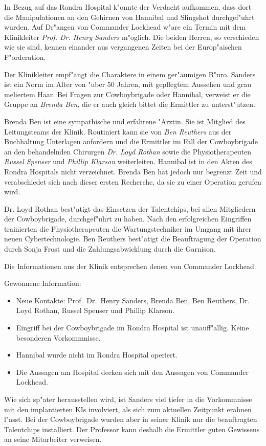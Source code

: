 
In Bezug auf das Rondra Hospital k"onnte der Verdacht aufkommen, dass dort die Manipulationen an den Gehirnen von Hannibal und Slingshot durchgef"uhrt wurden. Auf Dr"angen von Commander Lockhead w"are ein Termin mit dem Klinikleiter \emph{Prof. Dr. Henry Sanders} m"oglich. Die beiden Herren, so verschieden wie sie sind, kennen einander aus vergangenen Zeiten bei der Europ"aischen F"orderation.

Der Klinikleiter empf"angt die Charaktere in einem ger"aumigen B"uro. Sanders ist ein Norm im Alter von "uber 50 Jahren, mit gepflegtem Aussehen und grau meliertem Haar. Bei Fragen zur Cowboybrigade oder Hannibal, verweist er die Gruppe an \emph{Brenda Ben}, die er auch gleich bittet die Ermittler zu unterst"utzen. 

Brenda Ben ist eine sympathische und erfahrene "Arztin. Sie ist Mitglied des Leitungsteams der Klinik. Routiniert kann sie von 
\emph{Ben Reuthers} aus der Buchhaltung Unterlagen anfordern und die Ermittler im Fall der Cowboybrigade an den behandelnden Chirurgen \emph{Dr. Loyd Rothan} sowie die Physiotherapeuten \emph{Russel Spenser} und \emph{Phillip Klarson} weiterleiten. Hannibal ist in den Akten des Rondra Hospitals nicht verzeichnet. Brenda Ben hat jedoch nur begrenzt Zeit und verabschiedet sich nach dieser ersten Recherche, da sie zu einer Operation gerufen wird.

Dr. Loyd Rothan best"atigt das Einsetzen der Talentchips, bei allen Mitgliedern der Cowboybrigade, durchgef"uhrt zu haben. Nach den erfolgreichen Eingriffen trainierten die Physiotherapeuten die Wartungstechniker im Umgang mit ihrer neuen Cybertechnologie. Ben Reuthers best"atigt die Beauftragung der Operation durch Sonja Frost und die Zahlungsabwicklung durch die Garnison.

Die Informationen aus der Klinik entsprechen denen von Commander Lockhead.

\begin{remarks}
	Gewonnene Information: 
	
	\begin{itemize}
		\item Neue Kontakte: Prof.~Dr.~Henry Sanders, Brenda Ben, Ben Reuthers, Dr. Loyd Rothan, Russel Spenser und Phillip Klarson.
		\item Eingriff bei der Cowboybrigade im Rondra Hospital ist unauff"allig. Keine besonderen Vorkommnisse.
		\item Hannibal wurde nicht im Rondra Hospital operiert.
		\item Die Aussagen am Hospital decken sich mit den Aussagen von Commander Lockhead.
	\end{itemize}

	Wie sich sp"ater herausstellen wird, ist Sanders viel tiefer in die Vorkommnisse mit den implantierten KIs involviert, als sich zum aktuellen Zeitpunkt erahnen l"asst. Bei der Cowboybrigade wurden aber in seiner Klinik nur die beauftragten Talentchips installiert. Der Professor kann deshalb die Ermittler guten Gewissens an seine Mitarbeiter verweisen.
\end{remarks}

